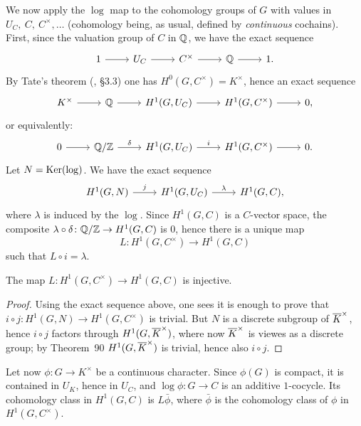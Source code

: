 \begin{subappendices}
We now apply the $\log$ map to the cohomology groups of $G$ with values in
$U_C,~C,~C^\times, \hdots$ (cohomology being, as usual, defined by
\emph{continuous} cochains). First, since the valuation group of $C$ in $\mathbb{Q}$, we
have the exact sequence
\[\begin{tikzcd}
	1 \rar & U_C \rar & C^\times \rar & \Q \rar & 1.
\end{tikzcd}\]
By Tate's theorem (\cite{39}, \S 3.3) one has $H^0(G, C^\times) = K^\times$,
hence an exact sequence
\[\begin{tikzcd}
	K^\times \rar & \Q \rar & H^1(G, U_C) \rar & H^1(G,C^\times) \rar & 0,
\end{tikzcd}\]
\dpage
or equivalently: 
\[\begin{tikzcd}
	0 \rar & \Q / \Z \rar["\delta"] & H^1(G, U_C) \rar["i"] & H^1(G,
	C^\times) \rar & 0.
\end{tikzcd}\]
Let $N = \operatorname{Ker}(\log)$. We have the exact sequence
\[\begin{tikzcd}
	H^1(G,N) \rar["j"] & H^1(G,U_C) \rar["\lambda"] & H^1(G,C),
\end{tikzcd}\]
where $\lambda$ is induced by the $\log$. Since $H^1(G,C)$ is a $C$-vector
space, the composite $\lambda \circ \delta \colon \mathbb{Q} / \mathbb{Z} \to H^1(G,C)$ is $0$,
hence there is a unique map
\[
	L \colon H^1(G,C^\times) \longrightarrow H^1(G,C)  
\]
such that $L \circ i = \lambda$.

\begin{prop}
The map $L \colon H^1(G,C^\times) \to H^1(G,C)$ is injective. 
\end{prop}

\begin{proof}
Using the exact sequence above, one sees it is enough to prove that $i \circ j
\colon H^1(G,N) \to H^1(G,C^\times)$ is trivial. But $N$ is a discrete subgroup
of $\overline{K}^\times$, hence $i \circ j$ factors through $H^1(G,
\overline{K}^\times)$, where now $\overline{K}^\times$ is viewes as a discrete group;
by Theorem~90 $H^1(G, \overline{K}^\times)$ is trivial, hence also $i \circ j$.
\end{proof}

Let now $\phi \colon G \to K^\times$ be a continuous character. Since $\phi(G)$
is compact, it is contained in $U_K$, hence in $U_C$, and $\log \phi \colon G
\to C$ is an additive $1$-cocycle. Its cohomology class in $H^1(G,C)$ is
$L\bar{\phi}$, where $\bar{\phi}$ is the cohomology class of $\phi$ in
$H^1(G,C^\times)$.

\dpage


\end{subappendices}
